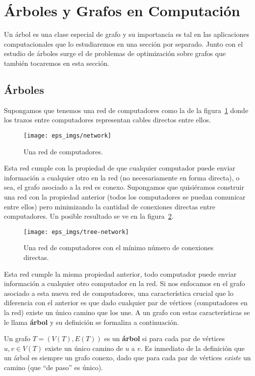 \section{Árboles y Grafos en Computación}

Un árbol es una clase especial de grafo y su importancia es tal en las aplicaciones computacionales que lo estudiaremos en una sección por separado.
Junto con el estudio de árboles surge el de problemas de optimización sobre grafos que también tocaremos en esta sección.

\subsection{Árboles}

Supongamos que tenemos una red de computadores como la de la figura~\ref{fig:network} donde los trazos entre computadores representan cables directos entre ellos.
\begin{figure}[h!]
\centering
\texttt{[image: eps\_imgs/network]}
\caption{Una red de computadores.}
\label{fig:network}
\end{figure}
Esta red cumple con la propiedad de que cualquier computador puede enviar información a cualquier otro en la red (no necesariamente en forma directa), o sea, el grafo asociado a la red es conexo.
Supongamos que quisiéramos construir una red con la propiedad anterior (todos los computadores se puedan comunicar entre ellos) pero minimizando la cantidad de conexiones directas entre computadores.
Un posible resultado se ve en la figura~\ref{fig:tree-network}.
\begin{figure}[h!]
\centering
\texttt{[image: eps\_imgs/tree-network]}
\caption{Una red de computadores con el mínimo número de conexiones directas.}
\label{fig:tree-network}
\end{figure}
Esta red cumple la misma propiedad anterior, todo computador puede enviar información a cualquier otro computador en la red.
Si nos enfocamos en el grafo asociado a esta nueva red de computadores, una característica crucial que lo diferencia con el anterior es que dado cualquier par de vértices (computadores en la red) existe un único camino que los une.
A un grafo con estas características se le llama {\bf árbol} y su definición se formaliza a continuación.

\begin{definicion}
Un grafo $T=(V(T),E(T))$ es un {\bf árbol} si para cada par de vértices $u,v\in V(T)$ existe un único camino de $u$ a $v$.
Es inmediato de la definición que un árbol es siempre un grafo conexo, dado que para cada par de vértices \emph{existe} un camino (que ``de paso'' es único).
\end{definicion}

